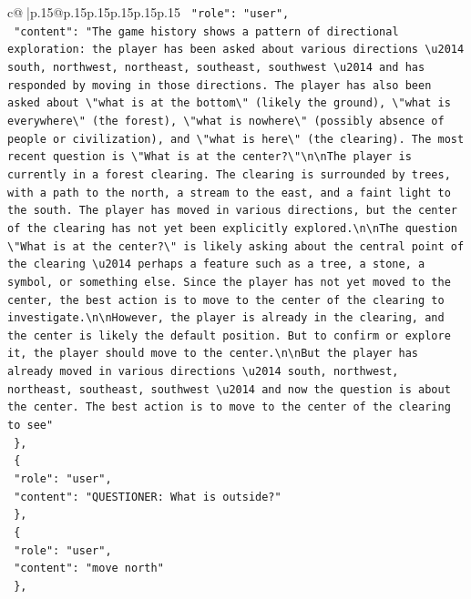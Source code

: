 \documentclass{article}
\begin{document}
{\begin{supertabular}{c@{$\;$}|p{.15\linewidth}@{}p{.15\linewidth}p{.15\linewidth}p{.15\linewidth}p{.15\linewidth}p{.15\linewidth}}
{{{\texttt{    "role": "user",} \\
\texttt{    "content": "The game history shows a pattern of directional exploration: the player has been asked about various directions \textbackslash{}u2014 south, northwest, northeast, southeast, southwest \textbackslash{}u2014 and has responded by moving in those directions. The player has also been asked about \textbackslash{}"what is at the bottom\textbackslash{}" (likely the ground), \textbackslash{}"what is everywhere\textbackslash{}" (the forest), \textbackslash{}"what is nowhere\textbackslash{}" (possibly absence of people or civilization), and \textbackslash{}"what is here\textbackslash{}" (the clearing). The most recent question is \textbackslash{}"What is at the center?\textbackslash{}"\textbackslash{}n\textbackslash{}nThe player is currently in a forest clearing. The clearing is surrounded by trees, with a path to the north, a stream to the east, and a faint light to the south. The player has moved in various directions, but the center of the clearing has not yet been explicitly explored.\textbackslash{}n\textbackslash{}nThe question \textbackslash{}"What is at the center?\textbackslash{}" is likely asking about the central point of the clearing \textbackslash{}u2014 perhaps a feature such as a tree, a stone, a symbol, or something else. Since the player has not yet moved to the center, the best action is to move to the center of the clearing to investigate.\textbackslash{}n\textbackslash{}nHowever, the player is already in the clearing, and the center is likely the default position. But to confirm or explore it, the player should move to the center.\textbackslash{}n\textbackslash{}nBut the player has already moved in various directions \textbackslash{}u2014 south, northwest, northeast, southeast, southwest \textbackslash{}u2014 and now the question is about the center. The best action is to move to the center of the clearing to see"} \\
\texttt{  \},} \\
\texttt{  \{} \\
\texttt{    "role": "user",} \\
\texttt{    "content": "QUESTIONER: What is outside?"} \\
\texttt{  \},} \\
\texttt{  \{} \\
\texttt{    "role": "user",} \\
\texttt{    "content": "move north"} \\
\texttt{  \},} \\
}}}
\end{supertabular}}
\end{document}

